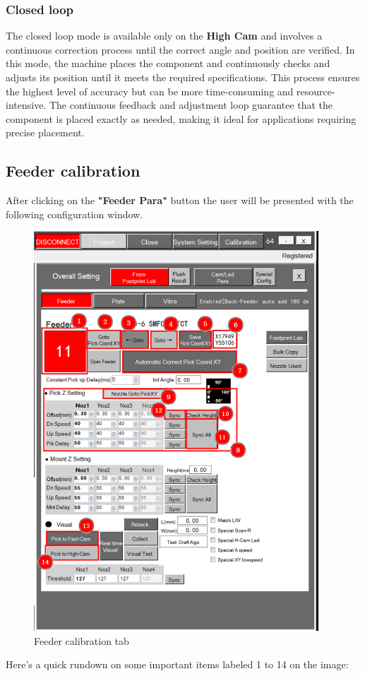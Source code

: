 \documentclass[a4paper,10pt]{report}
\begin{document}
\subsubsection{Closed loop}
The closed loop mode is available only on the \textbf{High Cam} and involves a continuous correction process until the correct angle and position are verified. In this mode, the machine places the component and continuously checks and adjusts its position until it meets the required specifications. This process ensures the highest level of accuracy but can be more time-consuming and resource-intensive. The continuous feedback and adjustment loop guarantee that the component is placed exactly as needed, making it ideal for applications requiring precise placement.

\newpage
\subsection{Feeder calibration}
After clicking on the \textbf{"Feeder Para"} button the user will be presented with the following configuration window.

\begin{figure}[!htb]
 \centering
 \includegraphics[width=0.95\textwidth]{images/scrot21.png}
 \caption{Feeder calibration tab}
\end{figure}
\newpage
Here's a quick rundown on some important items labeled 1 to 14 on the image:\\
\end{document}
